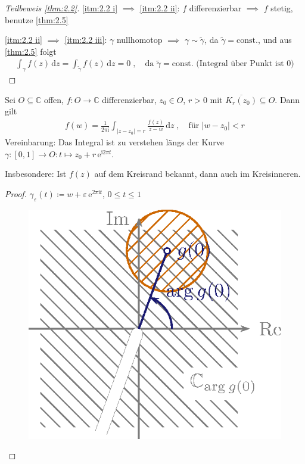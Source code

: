 \documentclass[a4paper,10pt]{scrbook}
\begin{document}
\begin{proof}[Teilbeweis \ref{thm:2.2}]
  \ref{itm:2.2 i} $\implies$ \ref{itm:2.2 ii}: $f$ differenzierbar $\implies$ $f$ stetig, benutze \ref{thm:2.5}

  \ref{itm:2.2 ii} $\implies$ \ref{itm:2.2 iii}: $\gamma$ nullhomotop $\implies$ $\gamma \sim \widetilde{\gamma}$, da $\widetilde{\gamma} = \text{const.}$, und aus \ref{thm:2.5} folgt
  \begin{align*}
    \int_{\gamma} f(z) \, \mathrm{d}z = \int_{\widetilde{\gamma}} f(z) \, \mathrm{d}z = 0 \; , \quad \text{da } \widetilde{\gamma} = \text{const.} \text{ (Integral über Punkt ist $0$)}
  \end{align*}
\end{proof}

\begin{theorem} \label{thm:2.6}
   Sei $O \subseteq \mathbb{C}$ offen, $f : O \to \mathbb{C}$ differenzierbar, $z_0 \in O$, $r > 0$ mit $\overline{K_r(z_0)} \subseteq O$. Dann gilt
  \begin{align*}
    f(w) = \frac{1}{2 \pi \mathrm{i}} \int_{|z-z_0| = r} \frac{f(z)}{z - w} \, \mathrm{d}z \; , \quad \text{für } |w-z_0| < r
  \end{align*}
  Vereinbarung: Das Integral ist zu verstehen längs der Kurve $\gamma : [0,1] \to O : t \mapsto z_0 + r \, \mathrm{e}^{\mathrm{i} 2 \pi t}$.

  Insbesondere: Ist $f(z)$ auf dem Kreisrand bekannt, dann auch im Kreisinneren.

  \begin{proof} $\gamma_\varepsilon(t) \coloneq w + \varepsilon \, \mathrm{e}^{2 \pi \mathrm{i} t}$, $0 \leq t \leq 1$

    \begin{figure}[H]
      \centering
      \includegraphics[scale=0.2]{images/ana3-tmp-17}
    \end{figure}


\end{proof}
\end{theorem}
\end{document}
